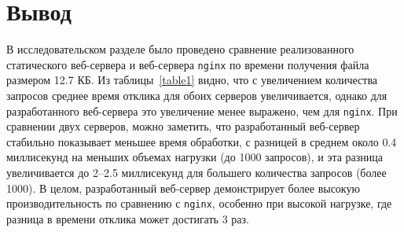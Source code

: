 \section*{Вывод}

В исследовательском разделе было проведено сравнение реализованного статического веб-сервера и веб-сервера \texttt{nginx} по времени получения файла размером 12.7 КБ.
Из таблицы~\ref{table1} видно, что с увеличением количества запросов среднее время отклика для обоих серверов увеличивается, однако для разработанного веб-сервера это увеличение менее выражено, чем для \texttt{nginx}.
При сравнении двух серверов, можно заметить, что разработанный веб-сервер стабильно показывает меньшее время обработки, с разницей в среднем около 0.4 миллисекунд на меньших объемах нагрузки (до 1000 запросов), и эта разница увеличивается до 2–2.5 миллисекунд для большего количества запросов (более 1000). 
В целом, разработанный веб-сервер демонстрирует более высокую производительность по сравнению с \texttt{nginx}, особенно при высокой нагрузке, где разница в времени отклика может достигать 3 раз.
